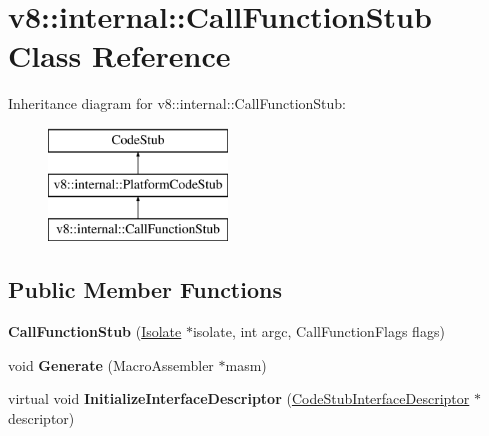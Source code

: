\hypertarget{classv8_1_1internal_1_1_call_function_stub}{}\section{v8\+:\+:internal\+:\+:Call\+Function\+Stub Class Reference}
\label{classv8_1_1internal_1_1_call_function_stub}
Inheritance diagram for v8\+:\+:internal\+:\+:Call\+Function\+Stub\+:\begin{figure}[H]
\begin{center}
\leavevmode
\includegraphics[height=3.000000cm]{classv8_1_1internal_1_1_call_function_stub}
\end{center}
\end{figure}
\subsection*{Public Member Functions}
\begin{DoxyCompactItemize}
\item 
\hypertarget{classv8_1_1internal_1_1_call_function_stub_a66230f97fd1c3b6f540285189d700de6}{}{\bfseries Call\+Function\+Stub} (\hyperlink{classv8_1_1internal_1_1_isolate}{Isolate} $\ast$isolate, int argc, Call\+Function\+Flags flags)\label{classv8_1_1internal_1_1_call_function_stub_a66230f97fd1c3b6f540285189d700de6}

\item 
\hypertarget{classv8_1_1internal_1_1_call_function_stub_abe051591383ef2084875caac3854b1c0}{}void {\bfseries Generate} (Macro\+Assembler $\ast$masm)\label{classv8_1_1internal_1_1_call_function_stub_abe051591383ef2084875caac3854b1c0}

\item 
\hypertarget{classv8_1_1internal_1_1_call_function_stub_afd1e4259f150395181ab5661e92e874b}{}virtual void {\bfseries Initialize\+Interface\+Descriptor} (\hyperlink{classv8_1_1internal_1_1_code_stub_interface_descriptor}{Code\+Stub\+Interface\+Descriptor} $\ast$descriptor)\label{classv8_1_1internal_1_1_call_function_stub_afd1e4259f150395181ab5661e92e874b}

\end{DoxyCompactItemize}
